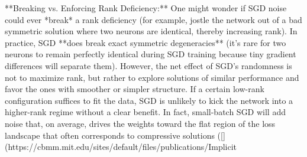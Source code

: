 **Breaking vs. Enforcing Rank Deficiency:** One might wonder if SGD noise could ever *break* a rank deficiency (for example, jostle the network out of a bad symmetric solution where two neurons are identical, thereby increasing rank). In practice, SGD **does break exact symmetric degeneracies** (it’s rare for two neurons to remain perfectly identical during SGD training because tiny gradient differences will separate them). However, the net effect of SGD’s randomness is not to maximize rank, but rather to explore solutions of similar performance and favor the ones with smoother or simpler structure. If a certain low-rank configuration suffices to fit the data, SGD is unlikely to kick the network into a higher-rank regime without a clear benefit. In fact, small-batch SGD will add noise that, on average, drives the weights toward the flat region of the loss landscape that often corresponds to compressive solutions ([](https://cbmm.mit.edu/sites/default/files/publications/Implicit%

